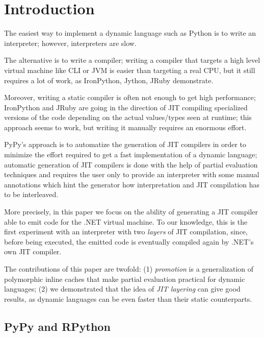 \section{Introduction}
The easiest way to implement a dynamic language such as Python is to write an
interpreter; however, interpreters are slow.

The alternative is to write a compiler; writing a compiler that targets a high
level virtual machine like CLI or JVM is easier than targeting a real CPU, but
it still requires a lot of work, as IronPython, Jython, JRuby demonstrate.

Moreover, writing a static compiler is often not enough to get high
performance; IronPython and JRuby are going in the direction of JIT compiling
specialized versions of the code depending on the actual values/types seen at
runtime; this approach seems to work, but writing it manually requires an
enormous effort.

PyPy's approach \cite{RiBo07_223} is to automatize the generation of JIT compilers in order
to minimize the effort required to get a fast implementation of a
dynamic language; automatic generation of JIT compilers is done with
the help of partial evaluation techniques and requires the user only
to provide an interpreter with some manual annotations which hint
the generator how interpretation and JIT compilation has to be interleaved. 

More precisely, in this paper we focus on the ability of generating a JIT compiler able to emit code
for the .NET virtual machine. To our knowledge, this is the first experiment with an interpreter with
two \emph{layers} of JIT compilation, since, before being executed, the
emitted code is eventually compiled again by .NET's own JIT compiler.

The contributions of this paper are twofold: (1) \emph{promotion} is a
generalization of polymorphic inline caches that make partial evaluation
practical for dynamic languages; (2) we demonstrated that the idea of
\emph{JIT layering} can give good results, as dynamic languages can be even
faster than their static counterparts.

\subsection{PyPy and RPython}

